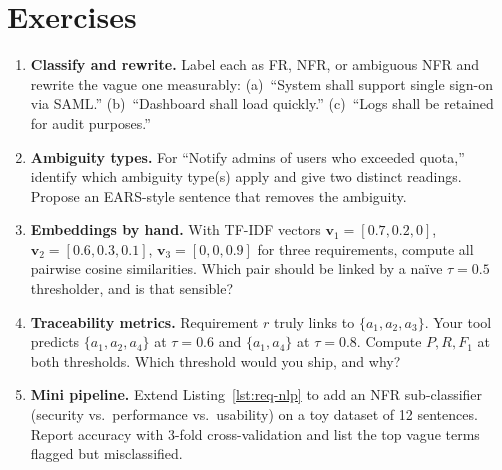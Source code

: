 \section{Exercises}\label{sec:req-ex}
\begin{enumerate}[label=E6.\arabic*, leftmargin=*, itemsep=0.75em]
  \item \textbf{Classify and rewrite.} Label each as FR, NFR, or ambiguous NFR and rewrite the vague one measurably: (a)~``System shall support single sign-on via SAML.'' (b)~``Dashboard shall load quickly.'' (c)~``Logs shall be retained for audit purposes.''
  \item \textbf{Ambiguity types.} For ``Notify admins of users who exceeded quota,'' identify which ambiguity type(s) apply and give two distinct readings. Propose an EARS-style sentence that removes the ambiguity.
  \item \textbf{Embeddings by hand.} With TF-IDF vectors $\mathbf{v}_1=[0.7,0.2,0]$, $\mathbf{v}_2=[0.6,0.3,0.1]$, $\mathbf{v}_3=[0,0,0.9]$ for three requirements, compute all pairwise cosine similarities. Which pair should be linked by a na\"ive $\tau=0.5$ thresholder, and is that sensible?
  \item \textbf{Traceability metrics.} Requirement $r$ truly links to $\{a_1,a_2,a_3\}$. Your tool predicts $\{a_1,a_2,a_4\}$ at $\tau=0.6$ and $\{a_1,a_4\}$ at $\tau=0.8$. Compute $P,R,F_1$ at both thresholds. Which threshold would you ship, and why?
  \item \textbf{Mini pipeline.} Extend Listing~\ref{lst:req-nlp} to add an NFR sub-classifier (security vs.\ performance vs.\ usability) on a toy dataset of 12 sentences. Report accuracy with 3-fold cross-validation and list the top vague terms flagged but misclassified.
\end{enumerate}
